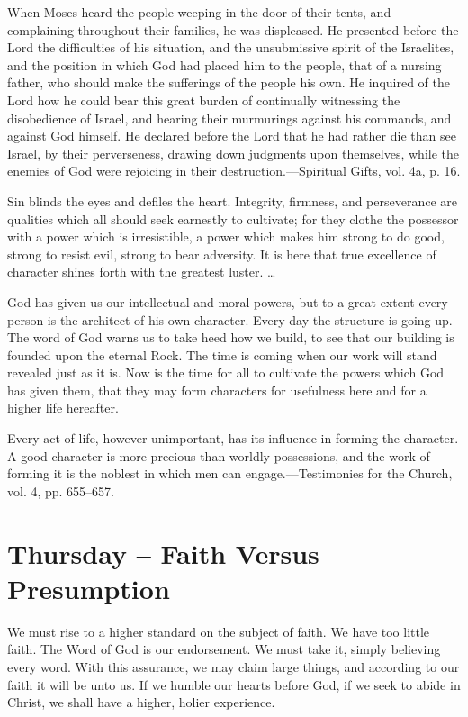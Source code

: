 \documentclass[a4paper, 10pt, twoside, headings=small]{scrartcl}
\begin{document}
\begin{multicols}{2}
When Moses heard the people weeping in the door of their tents, and complaining throughout their families, he was displeased. He presented before the Lord the difficulties of his situation, and the unsubmissive spirit of the Israelites, and the position in which God had placed him to the people, that of a nursing father, who should make the sufferings of the people his own. He inquired of the Lord how he could bear this great burden of continually witnessing the disobedience of Israel, and hearing their murmurings against his commands, and against God himself. He declared before the Lord that he had rather die than see Israel, by their perverseness, drawing down judgments upon themselves, while the enemies of God were rejoicing in their destruction.—Spiritual Gifts, vol. 4a, p. 16.

Sin blinds the eyes and defiles the heart. Integrity, firmness, and perseverance are qualities which all should seek earnestly to cultivate; for they clothe the possessor with a power which is irresistible, a power which makes him strong to do good, strong to resist evil, strong to bear adversity. It is here that true excellence of character shines forth with the greatest luster. …

God has given us our intellectual and moral powers, but to a great extent every person is the architect of his own character. Every day the structure is going up. The word of God warns us to take heed how we build, to see that our building is founded upon the eternal Rock. The time is coming when our work will stand revealed just as it is. Now is the time for all to cultivate the powers which God has given them, that they may form characters for usefulness here and for a higher life hereafter.

Every act of life, however unimportant, has its influence in forming the character. A good character is more precious than worldly possessions, and the work of forming it is the noblest in which men can engage.—Testimonies for the Church, vol. 4, pp. 655–657.

\section*{Thursday – Faith Versus Presumption}

We must rise to a higher standard on the subject of faith. We have too little faith. The Word of God is our endorsement. We must take it, simply believing every word. With this assurance, we may claim large things, and according to our faith it will be unto us. If we humble our hearts before God, if we seek to abide in Christ, we shall have a higher, holier experience.


\end{multicols}
\end{document}
